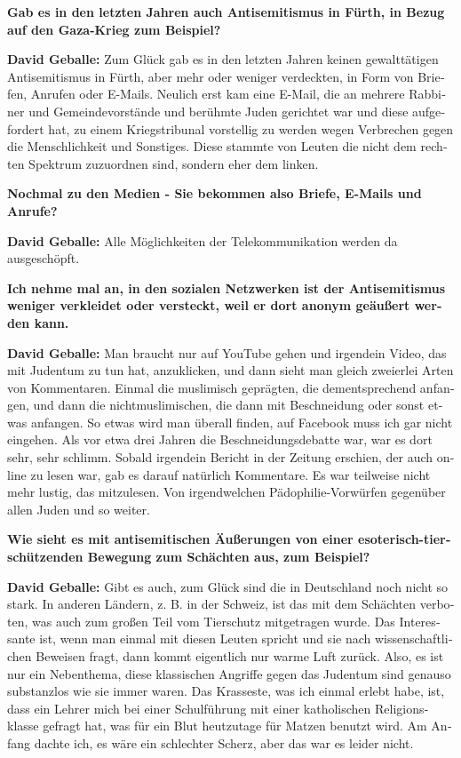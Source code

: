 \begin{otherlanguage}{ngerman}
\textbf{Gab es in den letzten Jahren auch Antisemitismus in Fürth, in Bezug auf den Gaza-Krieg zum Beispiel?} 

\textbf{David Geballe:} Zum Glück gab es in den letzten Jahren keinen gewalttätigen Antisemitismus in Fürth, aber mehr oder weniger verdeckten, in Form von Briefen, Anrufen oder E-Mails. Neulich erst kam eine E-Mail, die an mehrere Rabbiner und Gemeindevorstände und berühmte Juden gerichtet war und diese aufgefordert hat, zu einem Kriegstribunal vorstellig zu werden wegen Verbrechen gegen die Menschlichkeit und Sonstiges. Diese stammte von Leuten die nicht dem rechten Spektrum zuzuordnen sind, sondern eher dem linken. 

\textbf{Nochmal zu den Medien - Sie bekommen also Briefe, E-Mails und Anrufe?} 

\textbf{David Geballe:} Alle Möglichkeiten der Telekommunikation werden da ausgeschöpft. 

\textbf{Ich nehme mal an, in den sozialen Netzwerken ist der Antisemitismus weniger verkleidet oder versteckt, weil er dort anonym geäußert werden kann.} 

\textbf{David Geballe:} Man braucht nur auf YouTube gehen und irgendein Video, das mit Judentum zu tun hat, anzuklicken, und dann sieht man gleich zweierlei Arten von Kommentaren. Einmal die muslimisch geprägten, die dementsprechend anfangen, und dann die nichtmuslimischen, die dann mit Beschneidung oder sonst etwas anfangen. So etwas wird man überall finden, auf Facebook muss ich gar nicht eingehen. Als vor etwa drei Jahren die Beschneidungsdebatte war, war es dort sehr, sehr schlimm. Sobald irgendein Bericht in der Zeitung erschien, der auch online zu lesen war, gab es darauf natürlich Kommentare. Es war teilweise nicht mehr lustig, das mitzulesen. Von irgendwelchen Pädophilie-Vorwürfen gegenüber allen Juden und so weiter. 

\textbf{Wie sieht es mit antisemitischen Äußerungen von einer esoterisch-tierschützenden Bewegung zum Schächten aus, zum Beispiel?}

\textbf{David Geballe:} Gibt es auch, zum Glück sind die in Deutschland noch nicht so stark. In anderen Ländern, z. B. in der Schweiz, ist das mit dem Schächten verboten, was auch zum großen Teil vom Tierschutz mitgetragen wurde. Das Interessante ist, wenn man einmal mit diesen Leuten spricht und sie nach wissenschaftlichen Beweisen fragt, dann kommt eigentlich nur warme Luft zurück. Also, es ist nur ein Nebenthema, diese klassischen Angriffe gegen das Judentum sind genauso substanzlos wie sie immer waren. Das Krasseste, was ich einmal erlebt habe, ist, dass ein Lehrer mich bei einer Schulführung mit einer katholischen Religionsklasse gefragt hat, was für ein Blut heutzutage für Matzen benutzt wird. Am Anfang dachte ich, es wäre ein schlechter Scherz, aber das war es leider nicht. 


\end{otherlanguage}
